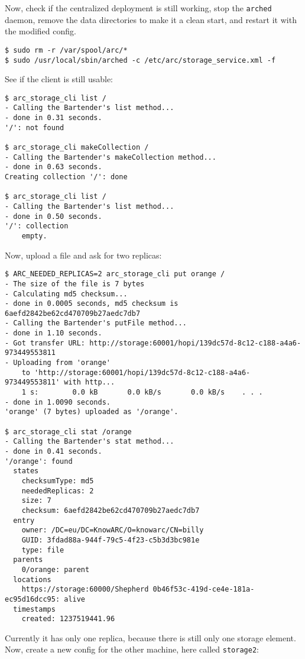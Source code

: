 \documentclass{article}
\begin{document}
Now, check if the centralized deployment is still working, stop the \verb!arched! daemon, remove the data directories to make it a clean start, and restart it with the modified config.

\begin{verbatim}
$ sudo rm -r /var/spool/arc/*
$ sudo /usr/local/sbin/arched -c /etc/arc/storage_service.xml -f    
\end{verbatim}

See if the client is still usable:

\begin{verbatim}
$ arc_storage_cli list /
- Calling the Bartender's list method...
- done in 0.31 seconds.
'/': not found

$ arc_storage_cli makeCollection /
- Calling the Bartender's makeCollection method...
- done in 0.63 seconds.
Creating collection '/': done

$ arc_storage_cli list /
- Calling the Bartender's list method...
- done in 0.50 seconds.
'/': collection
    empty.
\end{verbatim}

Now, upload a file and ask for two replicas:

\begin{verbatim}
$ ARC_NEEDED_REPLICAS=2 arc_storage_cli put orange /
- The size of the file is 7 bytes
- Calculating md5 checksum...
- done in 0.0005 seconds, md5 checksum is 6aefd2842be62cd470709b27aedc7db7
- Calling the Bartender's putFile method...
- done in 1.10 seconds.
- Got transfer URL: http://storage:60001/hopi/139dc57d-8c12-c188-a4a6-973449553811
- Uploading from 'orange'
    to 'http://storage:60001/hopi/139dc57d-8c12-c188-a4a6-973449553811' with http...
    1 s:        0.0 kB       0.0 kB/s       0.0 kB/s    . . .       
- done in 1.0090 seconds.
'orange' (7 bytes) uploaded as '/orange'.

$ arc_storage_cli stat /orange
- Calling the Bartender's stat method...
- done in 0.41 seconds.
'/orange': found
  states
    checksumType: md5
    neededReplicas: 2
    size: 7
    checksum: 6aefd2842be62cd470709b27aedc7db7
  entry
    owner: /DC=eu/DC=KnowARC/O=knowarc/CN=billy
    GUID: 3fdad88a-944f-79c5-4f23-c5b3d3bc981e
    type: file
  parents
    0/orange: parent
  locations
    https://storage:60000/Shepherd 0b46f53c-419d-ce4e-181a-ec95d16dcc95: alive
  timestamps
    created: 1237519441.96
\end{verbatim}

Currently it has only one replica, because there is still only one storage element. Now, create a new config for the other machine, here called \verb!storage2!:
\end{document}
